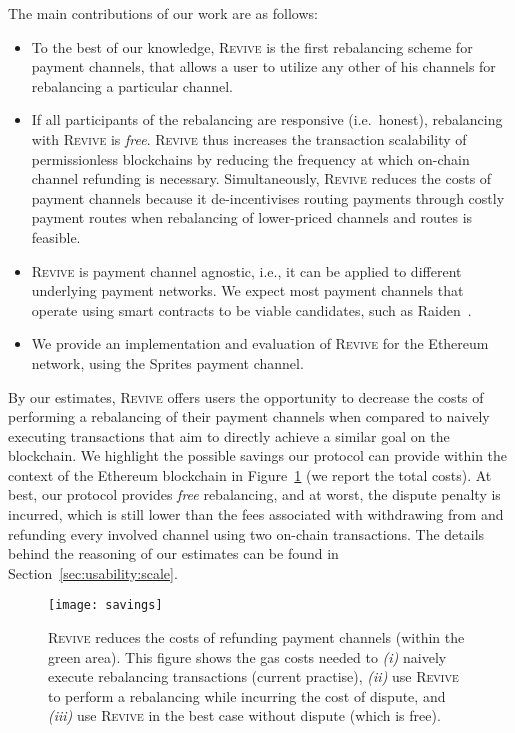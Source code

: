 \documentclass[sigconf]{acmart}
\newcommand{\name}{\textsc{Revive}\xspace}
\newcommand{\todo}[1]{{\bf \color{darkred}$\blacktriangleright$#1$\blacktriangleleft$}}
\begin{document}
The main contributions of our work are as follows:
\begin{itemize}
\item To the best of our knowledge, \name is the first rebalancing scheme for payment channels, that allows a user to utilize any other of his channels for rebalancing a particular channel.
\item If all participants of the rebalancing are responsive (i.e.\ honest), rebalancing with \name is \emph{free}. \name thus increases the transaction scalability of permissionless blockchains by reducing the frequency at which on-chain channel refunding is necessary. Simultaneously, \name reduces the costs of payment channels because it de-incentivises routing payments through costly payment routes when rebalancing of lower-priced channels and routes is feasible.
\item \name is payment channel agnostic, i.e., it can be applied to different underlying payment networks. We expect most payment channels that operate using smart contracts to be viable candidates, such as Raiden~\cite{raiden}.
\item We provide an implementation and evaluation of \name for the Ethereum network, using the Sprites\cite{sprites} payment channel.
\end{itemize}

By our estimates, \name offers users the opportunity to decrease the costs of performing a rebalancing of their payment channels when compared to naively executing transactions that aim to directly achieve a similar goal on the blockchain. We highlight the possible savings our protocol can provide within the context of the Ethereum blockchain in Figure~\ref{savings} (we report the total costs). At best, our protocol provides \emph{free} rebalancing, and at worst, the dispute penalty is incurred, which is still lower than the fees associated with withdrawing from and refunding every involved channel using two on-chain transactions. The details behind the reasoning of our estimates can be found in Section~\ref{sec:usability:scale}.

\begin{figure}
\texttt{[image: savings]}
\caption{\name reduces the costs of refunding payment channels (within the green area). This figure shows the gas costs needed to \emph{(i)} naively execute rebalancing transactions (current practise), \emph{(ii)} use \name to perform a rebalancing while incurring the cost of dispute, and \emph{(iii)} use \name in the best case without dispute (which is free).}
\label{savings}
\end{figure}
\end{document}
